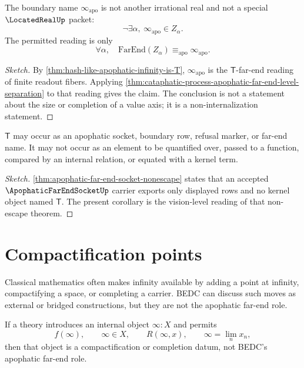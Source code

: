 \begin{corollary}
\label{cor:apophatic-infinity-not-located-real}
The boundary name $\infty_{\mathrm{apo}}$ is not another irrational real and
not a special $\LocatedRealUp$ packet:
$$
\neg\exists \alpha,\ \infty_{\mathrm{apo}}\in Z_\alpha.
$$
The permitted reading is only
$$
\forall \alpha,\quad
\mathrm{FarEnd}(Z_\alpha)\equiv_{\mathrm{apo}}\infty_{\mathrm{apo}}.
$$
\end{corollary}

\begin{proof}[Sketch]
By \autoref{thm:hash-like-apophatic-infinity-is-T},
$\infty_{\mathrm{apo}}$ is the $\mathsf{T}$-far-end reading of finite readout
fibers. Applying \autoref{thm:cataphatic-process-apophatic-far-end-level-separation}
to that reading gives the claim. The conclusion is not a statement about the
size or completion of a value axis; it is a non-internalization statement.
\end{proof}

\begin{corollary}
\label{cor:far-end-socket-not-element}
$\mathsf{T}$ may occur as an apophatic socket, boundary row, refusal marker,
or far-end name. It may not occur as an element to be quantified over, passed
to a function, compared by an internal relation, or equated with a kernel
term.
\end{corollary}

\begin{proof}[Sketch]
\autoref{thm:apophatic-far-end-socket-nonescape} states that an accepted
$\ApophaticFarEndSocketUp$ carrier exports only displayed rows and no kernel
object named $\mathsf{T}$. The present corollary is the vision-level reading
of that non-escape theorem.
\end{proof}

\section{Compactification points}
\label{sec:cataphatic-process-compactification-points}

Classical mathematics often makes infinity available by adding a point at
infinity, compactifying a space, or completing a carrier. BEDC can discuss
such moves as external or bridged constructions, but they are not the
apophatic far-end role.

\begin{principle}
\label{prin:compactification-points-external-bridge-objects}
If a theory introduces an internal object $\infty:X$ and permits
$$
f(\infty),\qquad
\infty\in X,\qquad
R(\infty,x),\qquad
\infty=\lim_n x_n,
$$
then that object is a compactification or completion datum, not BEDC's
apophatic far-end role.
\end{principle}

